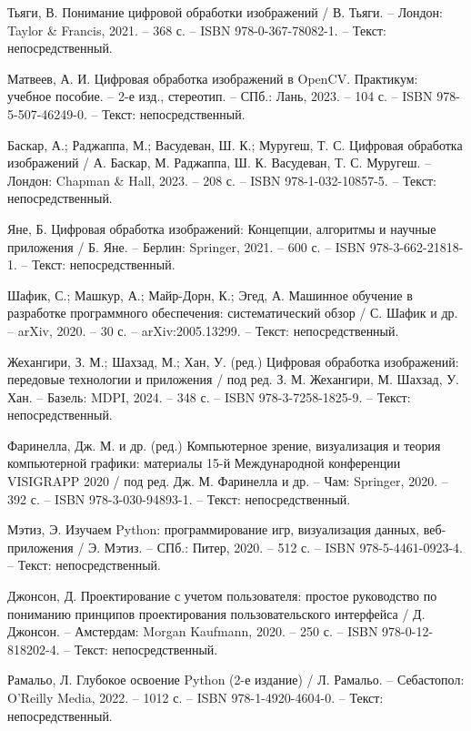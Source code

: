 \begin{thebibliography}{9}
    Тьяги, В. Понимание цифровой обработки изображений / В. Тьяги. – Лондон: Taylor \& Francis, 2021. – 368 с. – ISBN 978-0-367-78082-1. – Текст: непосредственный.
    
    Матвеев, А. И. Цифровая обработка изображений в OpenCV. Практикум: учебное пособие. – 2-е изд., стереотип. – СПб.: Лань, 2023. – 104 с. – ISBN 978-5-507-46249-0. – Текст: непосредственный.
    
    Баскар, А.; Раджаппа, М.; Васудеван, Ш. К.; Муругеш, Т. С. Цифровая обработка изображений / А. Баскар, М. Раджаппа, Ш. К. Васудеван, Т. С. Муругеш. – Лондон: Chapman \& Hall, 2023. – 208 с. – ISBN 978-1-032-10857-5. – Текст: непосредственный.
    
    Яне, Б. Цифровая обработка изображений: Концепции, алгоритмы и научные приложения / Б. Яне. – Берлин: Springer, 2021. – 600 с. – ISBN 978-3-662-21818-1. – Текст: непосредственный.
    
    Шафик, С.; Машкур, А.; Майр-Дорн, К.; Эгед, А. Машинное обучение в разработке программного обеспечения: систематический обзор / С. Шафик и др. – arXiv, 2020. – 30 с. – arXiv:2005.13299. – Текст: непосредственный.
    
    Жехангири, З. М.; Шахзад, М.; Хан, У. (ред.) Цифровая обработка изображений: передовые технологии и приложения / под ред. З. М. Жехангири, М. Шахзад, У. Хан. – Базель: MDPI, 2024. – 348 с. – ISBN 978-3-7258-1825-9. – Текст: непосредственный.
    
	Фаринелла, Дж. М. и др. (ред.) Компьютерное зрение, визуализация и теория компьютерной графики: материалы 15-й Международной конференции VISIGRAPP 2020 / под ред. Дж. М. Фаринелла и др. – Чам: Springer, 2020. – 392 с. – ISBN 978-3-030-94893-1. – Текст: непосредственный.
    
    Мэтиз, Э. Изучаем Python: программирование игр, визуализация данных, веб-приложения / Э. Мэтиз. – СПб.: Питер, 2020. – 512 с. – ISBN 978-5-4461-0923-4. – Текст: непосредственный.
    
    Джонсон, Д. Проектирование с учетом пользователя: простое руководство по пониманию принципов проектирования пользовательского интерфейса / Д. Джонсон. – Амстердам: Morgan Kaufmann, 2020. – 250 с. – ISBN 978-0-12-818202-4. – Текст: непосредственный.
    
    Рамальо, Л. Глубокое освоение Python (2-е издание) / Л. Рамальо. – Себастопол: O’Reilly Media, 2022. – 1012 с. – ISBN 978-1-4920-4604-0. – Текст: непосредственный.
    

\end{thebibliography}
